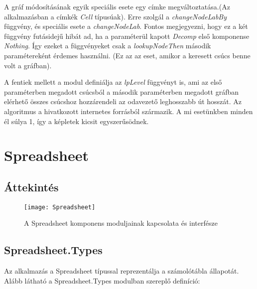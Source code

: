 A gráf módosításának egyik speciális esete egy címke megváltoztatása.(Az alkalmazásban a címkék \textit{Cell} típusúak). Erre szolgál a \textit{changeNodeLabBy} függvény, és speciális esete a \textit{changeNodeLab}. Fontos megjegyezni, hogy ez a két függvény futásidejű hibát ad, ha a paraméterül kapott \textit{Decomp} első komponense \textit{Nothing}. Így ezeket a függvényeket csak a \textit{lookupNodeThen} második paramétereként érdemes használni. (Ez az az eset, amikor a keresett csúcs benne volt a gráfban).

A fentiek mellett a modul definiálja az \textit{lpLevel} függvényt is, ami az első paraméterben megadott csúcsból a második paraméterben megadott gráfban elérhető összes csúcshoz hozzárendeli az odavezető leghosszabb út hosszát. Az algoritmus a hivatkozott internetes forrásból \cite{lp_geeks} származik. A mi esetünkben minden él súlya 1, így a képletek kicsit egyszerűsödnek.

\section{Spreadsheet}

\subsection{Áttekintés}

\begin{figure}[H]
	\centering
	\texttt{[image: Spreadsheet]}
	\caption{A Spreadsheet komponens moduljainak kapcsolata és interfésze}
	\label{fig:appstructure}
\end{figure}

\subsection{Spreadsheet.Types}

Az alkalmazás a Spreadsheet típussal reprezentálja a számolótábla állapotát. Alább látható a Spreadsheet.Types modulban szereplő definíció:

